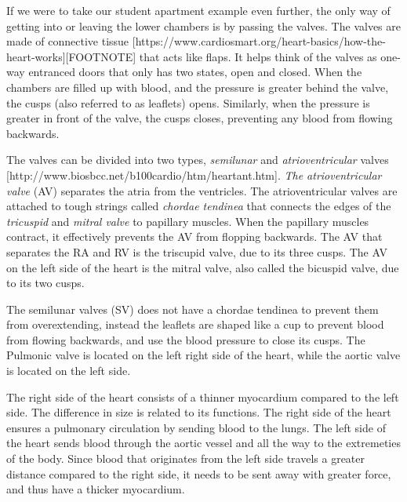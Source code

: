 If we were to take our student apartment example even further, the only way of getting into or leaving the lower chambers is by passing the valves. The valves are made of connective tissue [https://www.cardiosmart.org/heart-basics/how-the-heart-works][FOOTNOTE] that acts like flaps. It helps think of the valves as one-way entranced doors that only has two states, open and closed. When the chambers are filled up with blood, and the pressure is greater behind the valve, the cusps (also referred to as leaflets) opens. Similarly, when the pressure is greater in front of the valve, the cusps closes, preventing any blood from flowing backwards. 

The valves can be divided into two types, \textit{semilunar} and \textit{atrioventricular} valves [http://www.biosbcc.net/b100cardio/htm/heartant.htm]. \textit{The atrioventricular valve} (AV) separates the atria from the ventricles. The atrioventricular valves are attached to tough strings called \textit{chordae tendinea} that connects the edges of the \textit{tricuspid} and  \textit{mitral valve} to papillary muscles. When the papillary muscles contract, it effectively prevents the AV from flopping backwards. %
The  AV that separates the RA and RV is the triscupid valve, due to its three cusps. The AV on the left side of the heart is the mitral valve, also called the bicuspid valve, due to its two cusps. 

The semilunar valves (SV) does not have a chordae tendinea to prevent them from overextending, instead the leaflets are shaped like a cup to prevent blood from flowing backwards, and use the blood pressure to close its cusps. The Pulmonic valve is located on the left right side of the heart, while the aortic valve is located on the left side.


The right side of the heart consists of a thinner myocardium compared to the left side. The difference in size is related to its functions. The right side of the heart ensures a pulmonary circulation by sending blood to the lungs. The left side of the heart sends blood through the aortic vessel and all the way to the extremeties of the body. Since blood that originates from the left side travels a greater distance compared to the right side, it needs to be sent away with greater force, and thus have a thicker myocardium.



